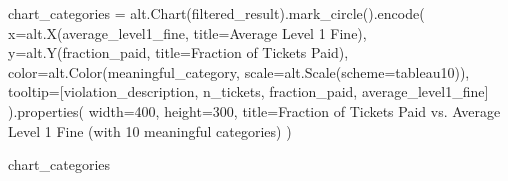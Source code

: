 \documentclass[
  letterpaper,
  DIV=11,
  numbers=noendperiod]{scrartcl}
\newenvironment{Shaded}{\begin{snugshade}}{\end{snugshade}}
\newcommand{\DecValTok}[1]{\textcolor[rgb]{0.68,0.00,0.00}{#1}}
\newcommand{\NormalTok}[1]{\textcolor[rgb]{0.00,0.23,0.31}{#1}}
\newcommand{\OperatorTok}[1]{\textcolor[rgb]{0.37,0.37,0.37}{#1}}
\newcommand{\StringTok}[1]{\textcolor[rgb]{0.13,0.47,0.30}{#1}}
\begin{document}
\begin{Shaded}
\begin{Highlighting}[]
\NormalTok{chart\_categories }\OperatorTok{=}\NormalTok{ alt.Chart(filtered\_result).mark\_circle().encode(}
\NormalTok{    x}\OperatorTok{=}\NormalTok{alt.X(}\StringTok{\textquotesingle{}average\_level1\_fine\textquotesingle{}}\NormalTok{, title}\OperatorTok{=}\StringTok{\textquotesingle{}Average Level 1 Fine\textquotesingle{}}\NormalTok{),}
\NormalTok{    y}\OperatorTok{=}\NormalTok{alt.Y(}\StringTok{\textquotesingle{}fraction\_paid\textquotesingle{}}\NormalTok{, title}\OperatorTok{=}\StringTok{\textquotesingle{}Fraction of Tickets Paid\textquotesingle{}}\NormalTok{),}
\NormalTok{    color}\OperatorTok{=}\NormalTok{alt.Color(}\StringTok{\textquotesingle{}meaningful\_category\textquotesingle{}}\NormalTok{, scale}\OperatorTok{=}\NormalTok{alt.Scale(scheme}\OperatorTok{=}\StringTok{\textquotesingle{}tableau10\textquotesingle{}}\NormalTok{)),}
\NormalTok{    tooltip}\OperatorTok{=}\NormalTok{[}\StringTok{\textquotesingle{}violation\_description\textquotesingle{}}\NormalTok{, }\StringTok{\textquotesingle{}n\_tickets\textquotesingle{}}\NormalTok{, }\StringTok{\textquotesingle{}fraction\_paid\textquotesingle{}}\NormalTok{, }\StringTok{\textquotesingle{}average\_level1\_fine\textquotesingle{}}\NormalTok{]}
\NormalTok{).properties(}
\NormalTok{    width}\OperatorTok{=}\DecValTok{400}\NormalTok{,}
\NormalTok{    height}\OperatorTok{=}\DecValTok{300}\NormalTok{,}
\NormalTok{    title}\OperatorTok{=}\StringTok{\textquotesingle{}Fraction of Tickets Paid vs. Average Level 1 Fine (with 10 meaningful categories)\textquotesingle{}}
\NormalTok{)}

\NormalTok{chart\_categories}
\end{Highlighting}
\end{Shaded}
\end{document}
